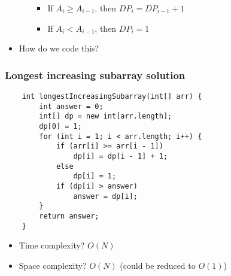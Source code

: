 \documentclass[t]{beamer}
\begin{document}
\begin{frame}
\begin{itemize}
\begin{itemize}
            \begin{itemize}

                \item

                If $A_i \geq A_{i-1}$, then $DP_i = DP_{i-1} + 1$

                \item

                If $A_i < A_{i-1}$, then $DP_i = 1$

            \end{itemize}

        \end{itemize}

        \pause

        \item

        How do we code this?

    \end{itemize}

\end{frame}

\begin{frame}[fragile]

    \frametitle{Longest increasing subarray solution}
    
    \begin{verbatim}
    int longestIncreasingSubarray(int[] arr) {
        int answer = 0;
        int[] dp = new int[arr.length];
        dp[0] = 1;
        for (int i = 1; i < arr.length; i++) {
            if (arr[i] >= arr[i - 1])
                dp[i] = dp[i - 1] + 1;
            else
                dp[i] = 1;
            if (dp[i] > answer)
                answer = dp[i];
        }
        return answer;
    }
    \end{verbatim}

    \pause

    \begin{itemize}

        \item

        Time complexity? \pause $O(N)$ \pause

        \item

        Space complexity? \pause $O(N)$ \pause (could be reduced to $O(1)$)

    \end{itemize}

\end{frame}
\end{document}
